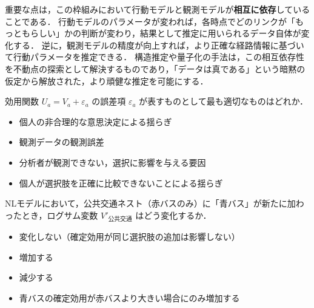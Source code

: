 

重要な点は，この枠組みにおいて行動モデルと観測モデルが\textbf{相互に依存}していることである．
行動モデルのパラメータが変われば，各時点でどのリンクが「もっともらしい」かの判断が変わり，結果として推定に用いられるデータ自体が変化する．
逆に，観測モデルの精度が向上すれば，より正確な経路情報に基づいて行動パラメータを推定できる．
構造推定や量子化の手法は，この相互依存性を不動点の探索として解決するものであり，「データは真である」という暗黙の仮定から解放された，より頑健な推定を可能にする．


\begin{example}[title={クイズ 1：誤差項の解釈}]
効用関数 $U_a = V_a + \varepsilon_a$ の誤差項 $\varepsilon_a$ が表すものとして最も適切なものはどれか．
\begin{itemize}
  \item[(ア)] 個人の非合理的な意思決定による揺らぎ
  \item[(イ)] 観測データの観測誤差
  \item[(ウ)] 分析者が観測できない，選択に影響を与える要因
  \item[(エ)] 個人が選択肢を正確に比較できないことによる揺らぎ
\end{itemize}
\end{example}

\begin{example}[title={クイズ 2：ログサム変数の直感的意味}]
NLモデルにおいて，公共交通ネスト（赤バスのみ）に「青バス」が新たに加わったとき，ログサム変数 $V'_{\text{公共交通}}$ はどう変化するか．
\begin{itemize}
  \item[(ア)] 変化しない（確定効用が同じ選択肢の追加は影響しない）
  \item[(イ)] 増加する
  \item[(ウ)] 減少する
  \item[(エ)] 青バスの確定効用が赤バスより大きい場合にのみ増加する
\end{itemize}
\end{example}

